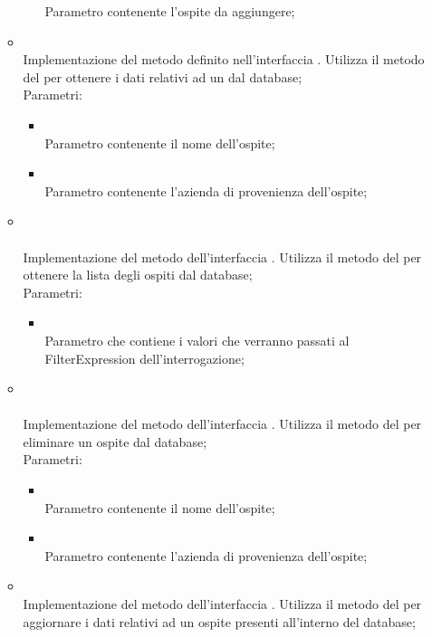 \begin{itemize}
\begin{itemize}
\begin{itemize}
			Parametro contenente l'ospite da aggiungere;
		\end{itemize}
		\item[]  \\		Implementazione del metodo definito nell'interfaccia . Utilizza il metodo  del  per ottenere i dati relativi ad un  dal database;\\
		Parametri:
		\begin{itemize}
			\item {} \\
			Parametro contenente il nome dell'ospite;
			\item {} \\
			Parametro contenente l'azienda di provenienza dell'ospite;
		\end{itemize}
		\item[] \\ \\		Implementazione del metodo dell'interfaccia . Utilizza il metodo  del  per ottenere la lista degli ospiti dal database;\\
		Parametri:
		\begin{itemize}
			\item {} \\
			Parametro che contiene i valori che verranno passati al FilterExpression dell'interrogazione;
		\end{itemize}
		\item[]  \\\\		Implementazione del metodo dell'interfaccia . Utilizza il metodo  del  per eliminare un ospite dal database;\\
		Parametri:
		\begin{itemize}
			\item {} \\
			Parametro contenente il nome dell'ospite;
			\item {} \\
			Parametro contenente l'azienda di provenienza dell'ospite;
		\end{itemize}
		\item[]  \\		Implementazione del metodo dell'interfaccia . Utilizza il metodo  del  per aggiornare i dati relativi ad un ospite presenti all'interno del database;\\

\end{itemize}
\end{itemize}
